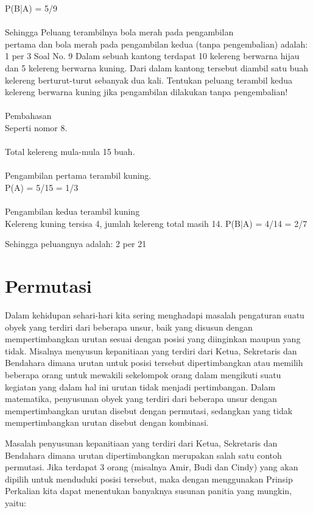\documentclass[11pt,fleqn]{book} %
\begin{document}
P(B|A) = 5/9\\
\\
Sehingga Peluang terambilnya bola merah pada pengambilan\\ pertama dan bola merah pada pengambilan kedua (tanpa pengembalian) adalah:
1 per 3
Soal No. 9
Dalam sebuah kantong terdapat 10 kelereng berwarna hijau dan 5 kelereng berwarna kuning. Dari dalam kantong tersebut diambil satu buah kelereng berturut-turut sebanyak dua kali. Tentukan peluang terambil kedua kelereng berwarna kuning jika pengambilan dilakukan tanpa pengembalian! \\
\\
Pembahasan\\
Seperti nomor 8.\\
\\
Total kelereng mula-mula 15 buah.\\
\\
Pengambilan pertama terambil kuning.\\
P(A) = 5/15 = 1/3\\
\\
Pengambilan kedua terambil kuning\\
Kelereng kuning tersisa 4, jumlah kelereng total masih 14. 
P(B|A) = 4/14 = 2/7

Sehingga peluangnya adalah:
2 per 21 

\section{Permutasi}
Dalam kehidupan sehari-hari kita sering menghadapi masalah pengaturan suatu obyek yang terdiri dari beberapa unsur, baik yang disusun dengan mempertimbangkan urutan sesuai dengan posisi yang diinginkan maupun yang tidak. Misalnya menyusun kepanitiaan yang terdiri dari Ketua, Sekretaris dan Bendahara dimana urutan untuk posisi tersebut dipertimbangkan atau memilih beberapa orang untuk mewakili sekelompok orang dalam mengikuti suatu kegiatan yang dalam hal ini urutan tidak menjadi pertimbangan. Dalam matematika, penyusunan obyek yang terdiri dari beberapa unsur dengan mempertimbangkan urutan disebut dengan permutasi, sedangkan yang tidak mempertimbangkan urutan disebut dengan kombinasi.


Masalah penyusunan kepanitiaan yang terdiri dari Ketua, Sekretaris dan Bendahara dimana urutan dipertimbangkan merupakan salah satu contoh permutasi. Jika terdapat 3 orang (misalnya Amir, Budi dan Cindy) yang akan dipilih untuk menduduki posisi tersebut, maka dengan menggunakan Prinsip Perkalian kita dapat menentukan banyaknya susunan panitia yang mungkin, yaitu:
\end{document}
